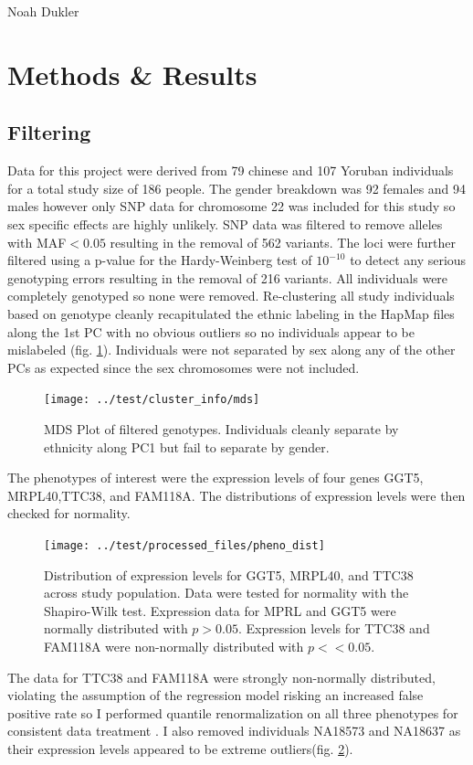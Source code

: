 \documentclass[12pt,a4paper]{article}
\begin{document}
\noindent Noah Dukler
\section{Methods \& Results}
\subsection{Filtering}
Data for this project were derived from 79 chinese and 107 Yoruban individuals for a total study size of 186 people. The gender breakdown was 92 females and 94 males however only SNP data for chromosome 22 was included for this study so sex specific effects are highly unlikely. SNP data was filtered to remove alleles with MAF$<0.05$ resulting in the removal of 562 variants. The loci were further filtered using a p-value for the Hardy-Weinberg test of $10^{-10}$ to detect any serious genotyping errors resulting in the removal of 216 variants. All individuals were completely genotyped so none were removed. Re-clustering all study individuals based on genotype cleanly recapitulated the ethnic labeling in the HapMap files along the 1st PC with no obvious outliers so no individuals appear to be mislabeled (fig. \ref{fig:mds}). Individuals were not separated by sex along any of the other PCs as expected since the sex chromosomes were not included.   

\begin{figure}[h]
\centering
\texttt{[image: ../test/cluster\_info/mds]}
\caption[MDS Plot]{MDS Plot of filtered genotypes. Individuals cleanly separate by ethnicity along PC1 but fail to separate by gender.}
\label{fig:mds}
\end{figure}

The phenotypes of interest were the expression levels of four genes GGT5, MRPL40,TTC38, and FAM118A. The distributions of expression levels were then checked for normality. 

\begin{figure}[h]
\centering
\texttt{[image: ../test/processed\_files/pheno\_dist]}
\caption[Pheno_dist]{Distribution of expression levels for GGT5, MRPL40, and TTC38 across study population. Data were tested for normality with the Shapiro-Wilk test. Expression data for MPRL and GGT5 were normally distributed with $p>0.05$. Expression levels for TTC38 and FAM118A were non-normally distributed with $p<<0.05$.}
\label{fig:pheno_dist}
\end{figure}

The data for TTC38 and FAM118A were strongly non-normally distributed, violating the assumption of the regression model risking an increased false positive rate so I performed quantile renormalization on all three phenotypes for consistent data treatment \cite{goh_effects_2009}. I also removed individuals NA18573 and NA18637 as their expression levels appeared to be extreme outliers(fig. \ref{fig:pheno_dist}). 
\end{document}
